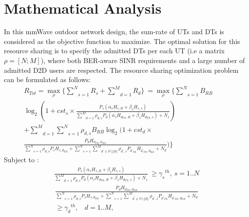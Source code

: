 \documentclass[conference,onecolumn,12pt]{IEEEtran}
\begin{document}
\section{Mathematical Analysis}
In this mmWave outdoor network design, the sum-rate of UTs and DTs is considered as the objective function to maximize. The optimal solution for this resource sharing is to specify the admitted DTs per each UT (i.e a matrix $\rho=[N;M]$), where both BER-aware SINR requirements and a large number of admitted D2D users are respected.
The resource sharing optimization problem can be formulated as follows:
\begin{equation} \label{eq9}
\begin{aligned}
R_{Tot}= \underset{\rho}{\max}\{\underset{s=1}{\overset{N}{\sum}}  R_s + \underset{d=1}{\overset{M}{\sum}} R_d\}\
= \underset{\rho}{\max}\{ \underset{s=1}{\overset{N}{\sum}} B_{RB}\ \ \ \ \ \ \ \ \ \ \ \\
\log_{2}(1+cst_s  \times \frac{P_s (\alpha_s H_{s,B} +\beta_s H_{s,s}) }
{ \underset{d=1} {\overset{M}{\sum}} \rho_{d,s} P_d(\alpha_s H_{d_{TX},B} +\beta_s H_{d_{TX},s} )+N_s})\ \ \\
+ \underset{d=1}{\overset{M}{\sum}} \underset{s=1} {\overset{N}{\sum}} \rho_{d,s} B_{RB} \log_{2}(1+cst_d \times \ \ \ \ \ \ \ \ \ \ \ \ \ \ \ \ \ \ \ \ \ \ \ \\
\frac{P_d H_{d_{TX},d_{RX}}}{ \underset{s=1} {\overset{N}{\sum}} \rho_{d,s}P_s H_{s,d_{RX}} + \underset{s=1} {\overset{N}{\sum}} \underset{d^{'}\in \mathbb{M}\setminus \{d\}} {\overset{M}{\sum}} \rho_{d^{'},s} P_{{d^{'}}_{TX}} H_{{d^{'}}_{TX},d_{RX}} +N_d} )\}
\end{aligned}
\end{equation}
Subject to :
\begin{equation} \label{eq10}
\begin{aligned}
\frac{P_s (\alpha_s H_{s,B} +\beta_s H_{s,s}) }
{ \underset{d=1} {\overset{M}{\sum}} \rho_{d,s} P_d(\alpha_s H_{d_{TX},B} +\beta_s H_{d_{TX},s} )+N_s}\ \geq {\gamma_s}^{th},\  s=1..N
\end{aligned}
\end{equation}
\begin{equation} \label{eq11}
\begin{aligned}
\frac{P_d H_{d_{TX},d_{RX}}}{ \underset{s=1} {\overset{N}{\sum}} \rho_{d,s}P_s H_{s,d_{RX}} +\underset{s=1} {\overset{N}{\sum}} \underset{d^{'}\in \mathbb{M}\setminus \{d\}} {\overset{M}{\sum}} \rho_{d^{'},s} P_{{d^{'}}_{TX}} H_{{d^{'}}_{TX},d_{RX}} +N_d}\\ \geq {\gamma_d}^{th},\ \ \ \  d=1..M,\ \ \ \ \ \ \ \ \ \ \ \ \ \ \ \ \ \ \ \ \ \ \ \ \ \ \ \ \ \
\end{aligned}
\end{equation}
\end{document}
